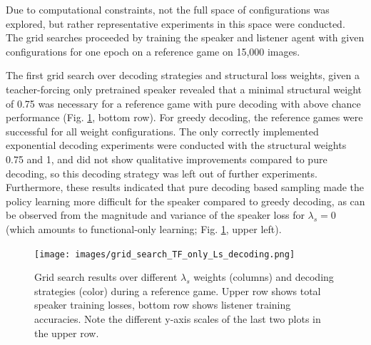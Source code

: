 Due to computational constraints, not the full space of configurations was explored, but rather representative experiments in this space were conducted. The grid searches proceeded by training the speaker and listener agent with given configurations for one epoch on a reference game on 15,000 images. 

The first grid search over decoding strategies and structural loss weights, given a teacher-forcing only pretrained speaker revealed that a minimal structural weight of 0.75 was necessary for a reference game with pure decoding with above chance performance (Fig. \ref{fig:coco_grid_Ls_decoding_TF_only}, bottom row). For greedy decoding, the reference games were successful for all weight configurations. The only correctly implemented exponential decoding experiments were conducted with the structural weights 0.75 and 1, and did not show qualitative improvements compared to pure decoding, so this decoding strategy was left out of further experiments. Furthermore, these results indicated that pure decoding based sampling made the policy learning more difficult for the speaker compared to greedy decoding, as can be observed from the magnitude and variance of the speaker loss for $\lambda_s = 0$ (which amounts to functional-only learning; Fig. \ref{fig:coco_grid_Ls_decoding_TF_only}, upper left).

\begin{figure}[h]
	\centering
	\texttt{[image: images/grid\_search\_TF\_only\_Ls\_decoding.png]}
	\caption{Grid search results over different $\lambda_s$ weights (columns) and decoding strategies (color) during a reference game. Upper row shows total speaker training losses, bottom row shows listener training accuracies. Note the different y-axis scales of the last two plots in the upper row.}
	\label{fig:coco_grid_Ls_decoding_TF_only}
\end{figure}

